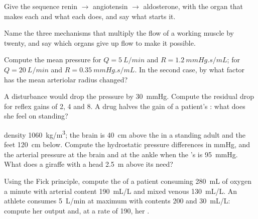 \begin{exercise}[$\star$]\label{exo:b2:blood-pressure:3}
Give the sequence renin $\to$ angiotensin $\to$ aldosterone, with
the organ that makes each and what each does, and say what starts
it.
\end{exercise}

\begin{exercise}[$\star$]\label{exo:b2:blood-pressure:4}
Name the three mechanisms that multiply the  flow of a
working muscle by twenty, and say which organs give up flow to make
it possible.
\end{exercise}

\begin{exercise}[$\star\star$]\label{exo:b2:blood-pressure:5}
Compute the mean pressure for $Q = \qty{5}{L/min}$ and $R =
\qty{1.2}{mmHg.s/mL}$; for $Q = \qty{20}{L/min}$ and $R =
\qty{0.35}{mmHg.s/mL}$. In the second case, by what factor has the
mean arteriolar radius changed?
\end{exercise}

\begin{exercise}[$\star\star$]\label{exo:b2:blood-pressure:6}
A disturbance would drop the pressure by \qty{30}{mmHg}. Compute the
residual drop for reflex gains of 2, 4 and 8. A drug halves the gain
of a patient's : what does she feel on standing?
\end{exercise}

\begin{exercise}[$\star\star$]\label{exo:b2:blood-pressure:7}
 density \qty{1060}{kg/m^3}; the brain is \qty{40}{cm} above the
 in a standing adult and the feet \qty{120}{cm} below. Compute
the hydrostatic pressure differences in mmHg, and the arterial
pressure at the brain and at the ankle when the 's is
\qty{95}{mmHg}. What does a giraffe with a head \qty{2.5}{m} above
its  need?
\end{exercise}

\begin{exercise}[$\star\star$]\label{exo:b2:blood-pressure:8}
Using the Fick principle, compute the  of a patient
consuming \qty{280}{mL} of oxygen a minute with arterial content
\qty{190}{mL/L} and mixed venous \qty{130}{mL/L}. An athlete
consumes \qty{5}{L/min} at maximum with contents 200 and
\qty{30}{mL/L}: compute her output and, at a rate of 190, her .
\end{exercise}

